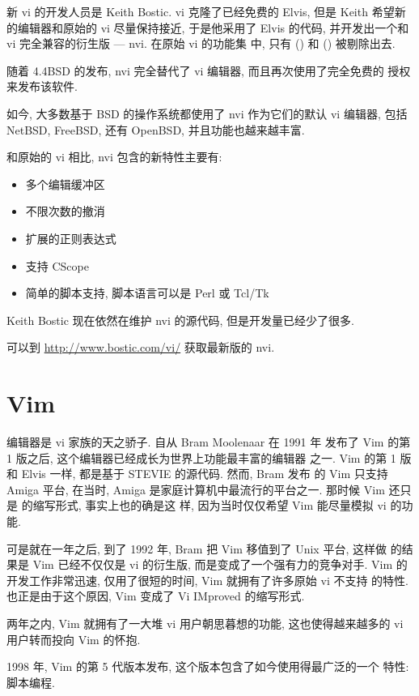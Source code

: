 新 vi 的开发人员是 Keith Bostic. vi 克隆了已经免费的 Elvis, 但是 
Keith 希望新的编辑器和原始的 vi 尽量保持接近, 于是他采用了 Elvis 的代码,
并开发出一个和 vi 完全兼容的衍生版 --- nvi. 在原始  vi 的功能集
中, 只有  () 和 
() 被剔除出去.

随着 4.4BSD 的发布, nvi 完全替代了 vi 编辑器, 而且再次使用了完全免费的
授权来发布该软件.

如今, 大多数基于 BSD 的操作系统都使用了 nvi 作为它们的默认 vi 编辑器,
包括 NetBSD, FreeBSD, 还有 OpenBSD, 并且功能也越来越丰富.

和原始的 vi 相比, nvi 包含的新特性主要有:
\begin{itemize}
    \item 多个编辑缓冲区
    \item 不限次数的撤消
    \item 扩展的正则表达式
    \item 支持 CScope
    \item 简单的脚本支持, 脚本语言可以是 Perl 或 Tcl/Tk
\end{itemize}

Keith Bostic 现在依然在维护 nvi 的源代码, 但是开发量已经少了很多.
\begin{warning}
    可以到 \url{http://www.bostic.com/vi/} 获取最新版的 nvi.
\end{warning}

\section{Vim}
\label{sec:vim}
 编辑器是 vi 家族的天之骄子. 自从 Bram Moolenaar 在 1991 年
发布了 Vim 的第 1 版之后, 这个编辑器已经成长为世界上功能最丰富的编辑器
之一.
Vim 的第 1 版和 Elvis 一样, 都是基于 STEVIE 的源代码. 然而, Bram 发布 
的 Vim 只支持 Amiga 平台, 在当时, Amiga 是家庭计算机中最流行的平台之一.
那时候 Vim 还只是  的缩写形式, 事实上也的确是这
样, 因为当时仅仅希望 Vim 能尽量模拟 vi 的功能.

可是就在一年之后, 到了 1992 年, Bram 把 Vim 移值到了 Unix 平台, 这样做
的结果是 Vim 已经不仅仅是 vi 的衍生版, 而是变成了一个强有力的竞争对手. Vim 
的开发工作非常迅速, 仅用了很短的时间, Vim 就拥有了许多原始 vi 不支持
的特性. 也正是由于这个原因, Vim 变成了 Vi IMproved 的缩写形式.

两年之内, Vim 就拥有了一大堆 vi 用户朝思暮想的功能, 这也使得越来越多的
vi 用户转而投向 Vim 的怀抱.

1998 年, Vim 的第 5 代版本发布, 这个版本包含了如今使用得最广泛的一个
特性: 脚本编程.

